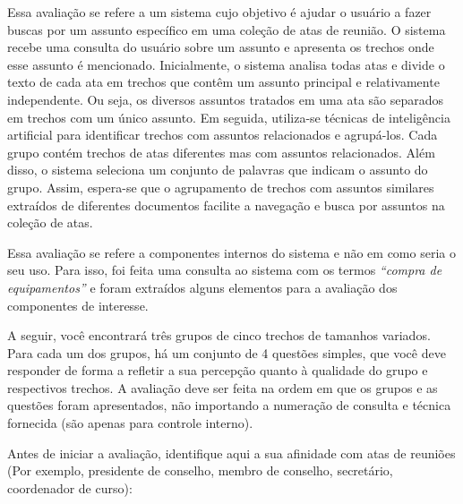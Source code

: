 
Essa avaliação se refere a um sistema cujo objetivo é ajudar o usuário a fazer buscas por um assunto específico em uma coleção de atas de reunião. O sistema recebe uma consulta do usuário sobre um assunto e apresenta os trechos onde esse assunto é mencionado. Inicialmente, o sistema analisa todas atas e divide o texto de cada ata em trechos que contêm um assunto principal e relativamente independente. Ou seja, os diversos assuntos tratados em uma ata são separados em trechos com um único assunto. Em seguida, utiliza-se técnicas de inteligência artificial para identificar trechos com assuntos relacionados e agrupá-los. Cada grupo contém trechos de atas diferentes mas com assuntos relacionados. Além disso, o sistema seleciona um conjunto de palavras que indicam o assunto do grupo. Assim, espera-se que o agrupamento de trechos com assuntos similares extraídos de diferentes documentos facilite a navegação e busca por assuntos na coleção de atas.

Essa avaliação se refere a componentes internos do sistema e não em como seria o seu uso. Para isso, foi feita uma consulta ao sistema com os termos \textit{``compra de equipamentos''} e foram extraídos 
%
%
alguns elementos 
para a avaliação dos componentes de interesse.

A seguir, você encontrará três grupos de cinco trechos de tamanhos variados. Para cada um dos grupos, há um conjunto de 4 questões simples, que você deve responder de forma a refletir a sua percepção quanto à qualidade do grupo e respectivos trechos. A avaliação deve ser feita na ordem em que os grupos e as questões foram apresentados, não importando a numeração de consulta e técnica fornecida (são apenas para controle interno).

Antes de iniciar a avaliação, identifique aqui a sua afinidade com atas de reuniões (Por exemplo, presidente de conselho, membro de conselho, secretário, coordenador de curso):










